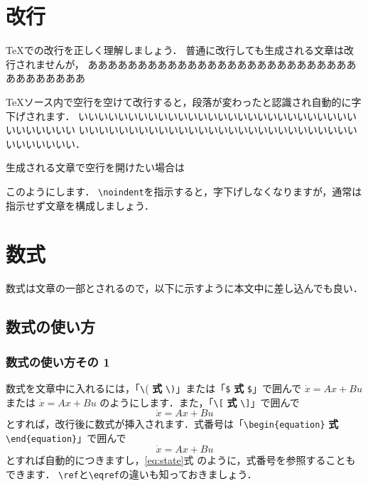 
\section{改行}
\TeX での改行を正しく理解しましょう．
普通に改行しても生成される文章は改行されませんが，
あああああああああああああああああああああああああああああああああああ

\TeX ソース内で空行を空けて改行すると，段落が変わったと認識され自動的に字下げされます．
いいいいいいいいいいいいいいいいいいいいいいいいいいいいいいいいいいい
いいいいいいいいいいいいいいいいいいいいいいいいいいいいいいいいいいい．

生成される文章で空行を開けたい場合は

\vspace*{1zh}
\noindent このようにします．
{\verb+\noindent+}を指示すると，字下げしなくなりますが，通常は指示せず文章を構成しましょう．

\section{数式}\label{sec:math}
数式は文章の一部とされるので，以下に示すように本文中に差し込んでも良い．
\subsection{数式の使い方}
\subsubsection{数式の使い方その 1}
数式を文章中に入れるには，「\verb+\+( \textbf{式} \verb+\)+」または「\verb+$+ \textbf{式} \verb+$+」で囲んで
\(
	\dot{x} = {A}{x} + {B}{u}
\) または $\dot{x} = Ax + Bu$ のようにします．また，「\verb+\[+ \textbf{式} \verb+\]+」で囲んで
\[
	\dot{x} = Ax + Bu
\]
とすれば，改行後に数式が挿入されます．式番号は「\verb+\begin{equation}+ \textbf{式} \verb+\end{equation}+」で囲んで
\begin{equation}
	\dot{x} = Ax + Bu
\label{eq:state}
\end{equation}
とすれば自動的につきますし，\eqref{eq:state}式 のように，式番号を参照することもできます．
\verb+\ref+と\verb+\eqref+の違いも知っておきましょう．


